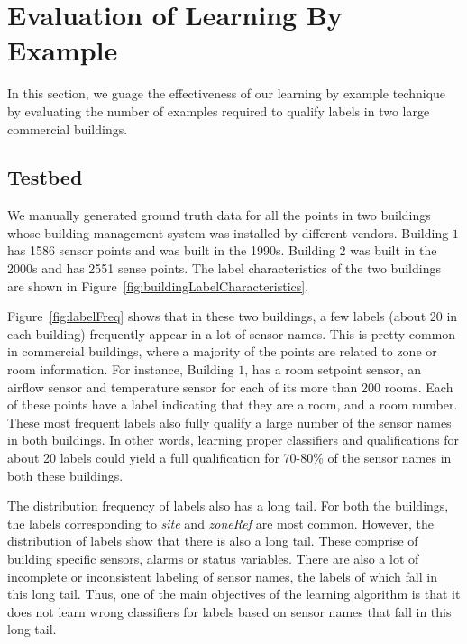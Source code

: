\section{Evaluation of Learning By Example}
\label{sec:eval}

In this section, we guage the effectiveness of our learning by example technique by evaluating the number of examples required to qualify labels in two large commercial buildings. 

\subsection{Testbed}

We manually generated ground truth data for all the points in two buildings whose building management system was installed by different vendors. Building $1$ has 1586 sensor points and was built in the 1990s. Building $2$ was built in the 2000s and has 2551 sense points. The label characteristics of the two buildings are shown in Figure~\ref{fig:buildingLabelCharacteristics}. 

Figure~\ref{fig:labelFreq} shows that in  these two buildings, a few labels (about 20 in each building) frequently appear in a lot of sensor names. This is pretty common in commercial buildings, where a majority of the points are related to zone or room information. For instance, Building $1$, has a room setpoint sensor, an airflow sensor and temperature sensor for each of its more than 200 rooms. Each of these points have a label indicating that they are a room, and a room number. These most frequent labels also fully qualify a large number of the sensor names in both buildings. In other words, learning proper classifiers and qualifications for about 20 labels could yield a full qualification for 70-80\% of the sensor names in both these buildings.

The distribution frequency of labels also has a long tail. For both the buildings, the labels corresponding to {\it site} and {\it zoneRef} are most common. However, the distribution of labels show that there is also a long tail. These comprise of building specific sensors, alarms or status variables. There are also a lot of incomplete or inconsistent labeling of sensor names, the labels of which fall in this long tail. Thus, one of the main objectives of the learning algorithm is that it does not learn wrong classifiers for labels based on sensor names that fall in this long tail.

